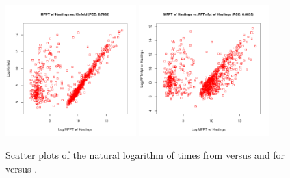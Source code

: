 \begin{figure}[!ht]
\centering
\includegraphics[width=0.45\textwidth]{Figures/Hermes/rnaMfptHastingsKinfold.pdf}
\quad
\includegraphics[width=0.45\textwidth]{Figures/Hermes/rnaMfptHastingsFftMfptHastings.pdf}
\caption{ Scatter plots of the natural logarithm of times from \rnamfpt
versus  and for \rnamfpt versus . }
\label{fig:hermes:scatterplotRnaMfptHastingsVsKinfoldAndFftMfpt}
\end{figure}

